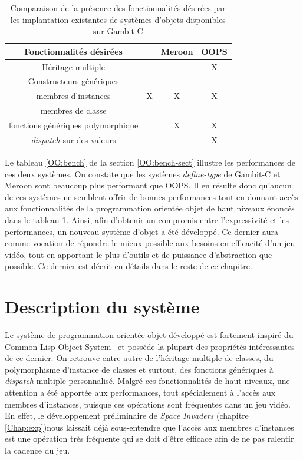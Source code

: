 \documentclass[12pt,oneside,letterpaper,francais]{book}
\newcommand{\si}{{\textit{Space Invaders }}}
\newcommand{\scheme}[1]{\selectlanguage{english}{\tt #1}\selectlanguage{french}}
\begin{document}
\begin{table}
  \center
  \begin{tabular}{cccc}
    \hline
    Fonctionnalités désirées           & \scheme{define-type} & Meroon & OOPS\\
    \hline \hline
    Héritage multiple                  &                      &         & X\\
    Constructeurs génériques           &                      &         &  \\
    membres d'instances                & X                    & X       & X\\
    membres de classe                  &                      &         &  \\
    fonctions génériques polymorphique &                      & X       & X\\
    \textit{dispatch} sur des valeurs  &                      &         & X\\
    \hline
  \end{tabular}
  \caption{Comparaison de la présence des fonctionnalités désirées par
    les implantation existantes de systèmes d'objets disponibles sur
    Gambit-C}
  \label{OO:fonct-comp}
\end{table}

Le tableau \ref{OO:bench} de la section \ref{OO:bench-sect} illustre
les performances de ces deux systèmes. On constate que les systèmes
\textit{define-type} de Gambit-C et Meroon sont beaucoup plus
performant que OOPS. Il en résulte donc qu'aucun de ces systèmes ne
semblent offrir de bonnes performances tout en donnant accès aux
fonctionnalités de la programmation orientée objet de haut niveaux
énoncés dans le tableau \ref{OO:fonct-comp}. Ainsi, afin d'obtenir un
compromis entre l'expressivité et les performances, un nouveau système
d'objet a été développé. Ce dernier aura comme vocation de répondre le
mieux possible aux besoins en efficacité d'un jeu vidéo, tout en
apportant le plus d'outils et de puissance d'abstraction que
possible. Ce dernier est décrit en détails dans le reste de ce
chapitre.


\section{Description du système}

Le système de programmation orientée objet développé est fortement
inspiré du Common Lisp Object System~\cite{CLOS} et possède la plupart
des propriétés intéressantes de ce dernier. On retrouve entre autre de
l'héritage multiple de classes, du polymorphisme d'instance de classes
et surtout, des fonctions génériques à \textit{dispatch} multiple
personnalisé. Malgré ces fonctionnalités de haut niveaux, une
attention a été apportée aux performances, tout spécialement à l'accès
aux membres d'instances, puisque ces opérations sont fréquentes dans
un jeu vidéo. En effet, le développement préliminaire de \si (chapitre
\ref{Chap:exp})nous laissait déjà sous-entendre que l'accès aux
membres d'instances est une opération très fréquente qui se doit
d'être efficace afin de ne pas ralentir la cadence du jeu.
\end{document}
